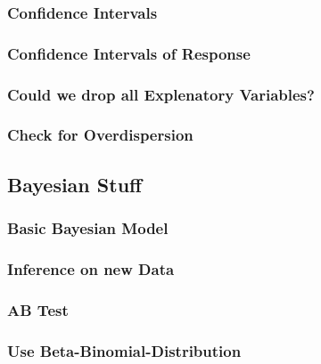 \subsubsection{Confidence Intervals}


\subsubsection{Confidence Intervals of Response}


\subsubsection{Could we drop all Explenatory Variables?}


\subsubsection{Check for Overdispersion}


\clearpage
\subsection{Bayesian Stuff}

\subsubsection{Basic Bayesian Model}


\subsubsection{Inference on new Data}


\subsubsection{AB Test}


\subsubsection{Use Beta-Binomial-Distribution}


